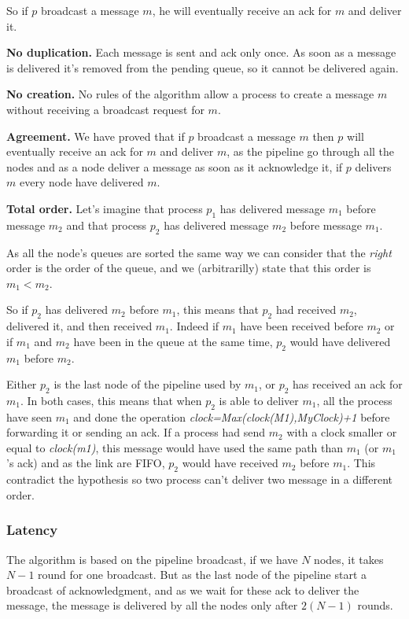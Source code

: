 \documentclass[a4paper]{article}
\begin{document}
So if $p$ broadcast a message $m$, he will eventually receive an ack for $m$
and deliver it.

\bigskip
\noindent\textbf{No duplication.} Each message is sent and ack only once. As
soon as a message is delivered it's removed from the pending queue, so it
cannot be delivered again.

\bigskip
\noindent\textbf{No creation.} No rules of the algorithm allow a process to
create a message $m$ without receiving a broadcast request for $m$.

\bigskip
\noindent\textbf{Agreement.} We have proved that if $p$ broadcast a message
$m$ then $p$ will eventually receive an ack for $m$ and deliver $m$, as the
pipeline go through all the nodes and as a node deliver a message as soon as
it acknowledge it, if $p$ delivers $m$ every node have delivered $m$.

\bigskip
\noindent\textbf{Total order.} Let's imagine that process $p_1$ has delivered
message $m_1$ before message $m_2$ and that process $p_2$ has delivered
message $m_2$ before message $m_1$.
        
As all the node's queues are sorted the same way we can consider that the
\textit{right} order is the order of the queue, and we (arbitrarilly) state
that this order is $m_1 < m_2$.

So if $p_2$ has delivered $m_2$ before $m_1$, this means that $p_2$ had
received $m_2$, delivered it, and then received $m_1$. Indeed if $m_1$ have
been received before $m_2$ or if $m_1$ and $m_2$ have been in the queue at the
same time, $p_2$ would have delivered $m_1$ before $m_2$.

Either $p_2$ is the last node of the pipeline used by $m_1$, or $p_2$ has
received an ack for $m_1$. In both cases, this means that when $p_2$ is able
to deliver $m_1$, all the process have seen $m_1$ and done the operation 
\textit{clock=Max(clock(M1),MyClock)+1} before forwarding it or sending an
ack. If a process had send $m_2$ with a clock smaller or equal to
\textit{clock(m1)}, this message would have used the same path than $m_1$
(or $m_1$'s ack) and as the link are FIFO, $p_2$ would have received $m_2$
before $m_1$. This contradict the hypothesis so two process can't deliver two
message in a different order.

\subsubsection{Latency}
The algorithm is based on the pipeline broadcast, if we have $N$ nodes, it takes
$N-1$ round for one broadcast. But as the last node of the pipeline start a
broadcast of acknowledgment, and as we wait for these ack to deliver the
message, the message is delivered by all the nodes only after $2(N-1)$ rounds.
\end{document}
